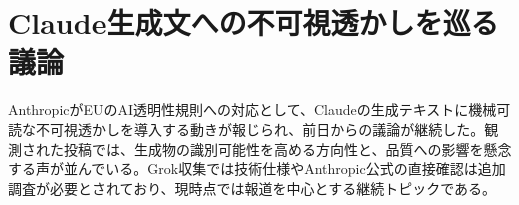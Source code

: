 \section{Claude生成文への不可視透かしを巡る議論}
AnthropicがEUのAI透明性規則への対応として、Claudeの生成テキストに機械可読な不可視透かしを導入する動きが報じられ、前日からの議論が継続した。観測された投稿では、生成物の識別可能性を高める方向性と、品質への影響を懸念する声が並んでいる。Grok収集では技術仕様やAnthropic公式の直接確認は追加調査が必要とされており、現時点では報道を中心とする継続トピックである。
